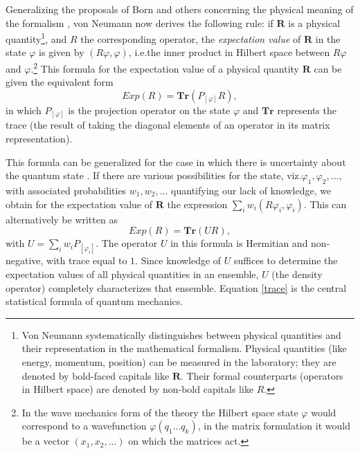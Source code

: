 \documentclass[12pt]{article}
\begin{document}
Generalizing the proposals of Born and others concerning the physical meaning of the formalism \cite[III.1]{VN1}, von Neumann now derives the following rule: if $\textbf{R}$ is a physical quantity\footnote{Von Neumann systematically distinguishes between physical quantities and their representation in the mathematical formalism. Physical quantities (like energy, momentum, position) can be measured in the laboratory; they are denoted by bold-faced capitals like $\textbf{R}$. Their formal counterparts (operators in Hilbert space) are denoted by non-bold capitals like $R$.}, and $R$ the corresponding operator, the \emph{expectation value} of $\textbf{R}$ in the state $\varphi$ is given by $(R\varphi, \varphi)$, i.e.\@ the inner product in Hilbert space between $R\varphi$ and $\varphi$.\footnote{In the wave mechanics form of the theory the Hilbert space state $\varphi$ would correspond to a wavefunction $\varphi(q_1...q_k)$, in the matrix formulation it would be a vector $(x_1, x_2,...)$ on which the matrices act.} This formula for the expectation value of a physical quantity $\textbf{R}$ can be given the equivalent form
\begin{equation*}
  Exp(R) = \textbf{Tr}(P_{[\varphi]}R),
\end{equation*}
in which $P_{[\varphi]}$ is the projection operator on the state $\varphi$ and $\textbf{Tr}$ represents the trace (the result of taking the diagonal elements of an operator in its matrix representation).

This formula can be generalized for the case in which there is uncertainty about the quantum state \cite[pp.\@ 157--158]{VN1}. If there are various possibilities for the state, viz.\@ $\varphi_1, \varphi_2, ...$, with associated probabilities $w_1, w_2, ...$ quantifying our lack of knowledge, we obtain for the expectation value of $\textbf{R}$ the expression $\sum_i w_i (R\varphi_i, \varphi_i)$. This can alternatively be written as
\begin{equation}\label{trace}
 Exp(R) = \textbf{Tr} (U R),
\end{equation}
with $ U = \sum_i w_i P_{[\varphi_i]}$. The operator $U$ in this formula is Hermitian and non-negative, with trace equal to $1$. Since knowledge of $U$ suffices to determine the expectation values of all physical quantities in an ensemble, $U$ (the density operator) completely characterizes that ensemble. Equation \ref{trace} is the central statistical formula of quantum mechanics.
\end{document}
